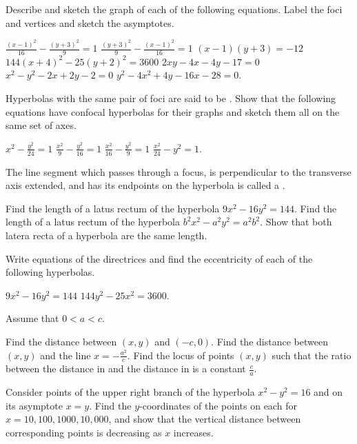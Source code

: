 \begin{exercises}
Describe and sketch the graph of each of the following equations.
Label the foci and vertices and sketch the asymptotes.
\begin{exenum}
\sx
$\frac{(x-1)^2}{16} - \frac{(y+3)^2}{9} = 1$
\sx
$\frac{(y+3)^2}{9} - \frac{(x-1)^2}{16} = 1$
\sx
$(x-1)(y+3) = -12$
\sx
$144(x+4)^2 - 25(y+2)^2 = 3600$
\sx
$2xy - 4x - 4y - 17 = 0$
\sx
$x^2 - y^2 - 2x + 2y - 2 = 0$
\sx
$y^2 - 4x^2 + 4y - 16x - 28 = 0$.
\end{exenum}

Hyperbolas with the same pair of foci are said to be
.  Show that the following equations
have confocal hyperbolas for their graphs and sketch
them all on the same set of axes.
\begin{exenum}
\sx
$x^2 - \frac{y^2}{24} = 1$
\sx
$\frac{x^2}{9} - \frac{y^2}{16} = 1$
\sx
$\frac{x^2}{16} - \frac{y^2}{9} = 1$
\sx
$\frac{x^2}{24} - y^2 = 1$.
\end{exenum}

The line segment which passes through a focus,
is perpendicular to the transverse axis extended,
and has its endpoints on the hyperbola is called a
.
\begin{exenum}
\sx
Find the length of a latus rectum of the hyperbola
$9x^2 - 16y^2 = 144$.
\sx
Find the length of a latus rectum of the hyperbola
$b^2x^2 - a^2y^2 = a^2b^2$.
\sx
Show that both latera recta of a hyperbola are the same length.
\end{exenum}

Write equations of the directrices and find the eccentricity
of each of the following hyperbolas.
\begin{exenum}
\sx
$9x^2 - 16y^2 = 144$
\sx
$144y^2 - 25x^2 = 3600$.
\end{exenum}

Assume that $0 < a < c$.
\begin{exenum}
\sx
{}
Find the distance between $(x,y)$ and $(-c,0)$.
\sx
{}
Find the distance between $(x,y)$ and the line
$x = -\frac{a^2}c$.
\sx
Find the locus of points $(x,y)$ such that the ratio between
the distance in  and the distance in 
is a constant $\frac ca$.
\end{exenum}

Consider points of the upper right branch of the hyperbola
$x^2-y^2=16$ and on its asymptote $x=y$.
Find the $y$-coordinates of the points on each for
$x = 10, 100, 1000, 10,000$, and show that the
vertical distance between corresponding points
is decreasing as $x$ increases.


\end{exercises}
